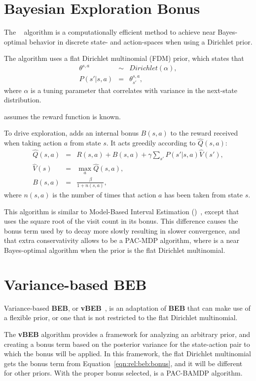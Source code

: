 \section{Bayesian Exploration Bonus}

The ~\cite{kolter09} algorithm is a computationally efficient method to achieve near Bayes-optimal behavior in discrete state- and action-spaces when using a Dirichlet prior.

The algorithm uses a flat Dirichlet multinomial (FDM) prior, which states that
\begin{eqnarray}
\theta^{s,a}&\sim&Dirichlet(\alpha),\\
P(s'|s,a)&=&\theta^{s,a}_{s'},
\end{eqnarray}
where $\alpha$ is a tuning parameter that correlates with variance in the next-state distribution.

 assumes the reward function is known.

To drive exploration,  adds an internal bonus $B(s,a)$ to the reward received when taking action $a$ from state $s$. It acts greedily according to $\hat Q(s,a)$:
\begin{eqnarray}
\hat Q(s,a)&=&R(s,a)+B(s,a)+\gamma \sum_{s'} P(s'|s,a)\hat V(s'),\\
\hat V(s)&=& \max_a \hat Q(s, a),\\
\label{eqn:rel:beb:bonus}
B(s,a)&=&\frac\beta{1+n(s,a)},
\end{eqnarray}
where $n(s,a)$ is the number of times that action $a$ has been taken from state $s$.

This algorithm is similar to Model-Based Interval Estimation ()~\cite{strehl06}, except that  uses the square root of the visit count in its bonus. This difference causes the bonus term used by  to decay more slowly resulting in slower convergence, and that extra conservativity allows  to be a PAC-MDP algorithm, where  is a near Bayes-optimal algorithm when the prior is the flat Dirichlet multinomial.

\section{Variance-based BEB}

Variance-based {\bf BEB}, or {\bf vBEB}~\cite{sorg10}, is an adaptation of {\bf BEB} that can make use of a flexible prior, or one that is not restricted to the flat Dirichlet multinomial.

The {\bf vBEB} algorithm provides a framework for analyzing an arbitrary prior, and creating a bonus term based on the posterior variance for the state-action pair to which the bonus will be applied. In this framework, the flat Dirichlet multinomial gets the bonus term from Equation~\ref{eqn:rel:beb:bonus}, and it will be different for other priors. With the proper bonus selected,  is a PAC-BAMDP algorithm.


